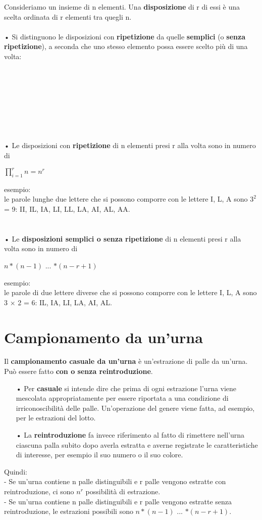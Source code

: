 \documentclass[12pt, letterpaper]{article}
\begin{document}
Consideriamo un insieme di n elementi. Una \textbf{disposizione} di r di essi è
una scelta ordinata di r elementi tra quegli n.\\
\\
• Si distinguono le disposizioni con \textbf{ripetizione} da quelle \textbf{semplici} (o
\textbf{senza ripetizione}), a seconda che uno stesso elemento possa
essere scelto più di una volta:
\\
\\
\\
\\
\\
\\
\\
\\
\\• Le disposizioni con \textbf{ripetizione} di n elementi presi r alla volta sono in
numero di
\begin{center}
   $\prod_{i=1}^{r}n = n^r$
\end{center}
esempio:
\\
le parole lunghe due lettere che si possono comporre con le
lettere I, L, A sono $3^2$ = 9: II, IL, IA, LI, LL, LA, AI, AL, AA.
\\
\\
\\
• Le \textbf{disposizioni semplici o senza ripetizione} di n elementi presi r alla
volta sono in numero di
\begin{center}
   $n * (n - 1)$ ... $* (n - r + 1)$
\end{center}
esempio:\\
le parole di due lettere diverse che si possono comporre con
le lettere I, L, A sono 3 × 2 = 6: IL, IA, LI, LA, AI, AL.

\section{Campionamento da un’urna}

Il \textbf{campionamento casuale da un’urna} è un’estrazione di palle da
un’urna. Può essere fatto \textbf{con o senza reintroduzione}.
\begin{itemize}
   \item[•] Per \textbf{casuale} si intende dire che prima di ogni estrazione l’urna viene
mescolata appropriatamente per essere riportata a una condizione di
irriconoscibilità delle palle. Un’operazione del genere viene fatta, ad
esempio, per le estrazioni del lotto.
   \item[•] La \textbf{reintroduzione} fa invece riferimento al fatto di rimettere nell’urna
ciascuna palla subito dopo averla estratta e averne registrate le
caratteristiche di interesse, per esempio il suo numero o il suo colore.
\end{itemize}
Quindi:
\\- Se un'urna contiene n palle distinguibili e r palle vengono estratte con reintroduzione,
ci sono \(n^r\) possibilità di estrazione.
\\- Se un'urna contiene n palle distinguibili e r palle vengono estratte senza reintroduzione,
le estrazioni possibili sono $n * (n - 1)$ ... $* (n - r + 1)$.
\end{document}
